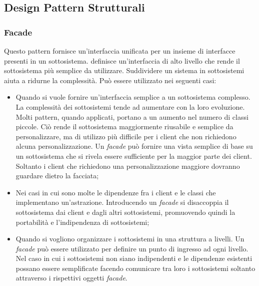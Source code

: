 \subsection{Design Pattern Strutturali}

\subsubsection{Facade}

Questo pattern fornisce un'interfaccia unificata per un insieme di interfacce presenti in un sottosistema.  definisce un'interfaccia di alto livello che rende il sottosistema più semplice da utilizzare. Suddividere un sistema in sottosistemi aiuta a ridurne la complessità. Può essere utilizzato nei seguenti casi:

\begin{itemize}

	\item Quando si vuole fornire un'interfaccia semplice a un sottosistema complesso. La complessità dei sottosistemi tende ad aumentare con la loro evoluzione. Molti pattern, quando applicati, portano a un aumento nel numero di classi piccole. Ciò rende il sottosistema maggiormente riusabile e semplice da personalizzare, ma di utilizzo più difficile per i client che non richiedono alcuna personalizzazione. Un \textit{facade} può fornire una vista semplice di base su un sottosistema che si rivela essere sufficiente per la maggior parte dei client. Soltanto i client che richiedono una personalizzazione maggiore dovranno guardare dietro la facciata;
	\item Nei casi in cui sono molte le dipendenze fra i client e le classi che implementano un'astrazione. Introducendo un \textit{facade} si disaccoppia il sottosistema dai client e dagli altri sottosistemi, promuovendo quindi la portabilità e l'indipendenza di sottosistemi;
	\item Quando si vogliono organizzare i sottosistemi in una struttura a livelli. Un \textit{facade} può essere utilizzato per definire un punto di ingresso ad ogni livello. Nel caso in cui i sottosistemi non siano indipendenti e le dipendenze esistenti possano essere semplificate facendo comunicare tra loro i sottosistemi soltanto attraverso i rispettivi oggetti \textit{facade}.

\end{itemize}


